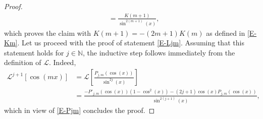 \documentclass[12pt,psamsfonts]{amsart}
\begin{document}
\begin{proof}
\begin{align*}
                                          &= \frac{K(m+1)}{\sin^{2(m+1)}(x)} ,
\end{align*}
which proves the claim with  $K(m+1)=-(2m+1)K(m)$ as defined in \eqref{E-Km}. Let us proceed with the
proof of statement \eqref{E-Ljm}. Assuming that this statement holds for $j\in {\mathbb{N}}$, the inductive step
follows immediately from the definition of ${\mathscr{L}}$. Indeed,
\begin{align*}
    {\mathscr{L}}^{j+1}[\cos(mx)]&= {\mathscr{L}}\left[ \frac{P_{j,m}(\cos(x))}{\sin^{2j}(x)}\right] \\
                       &= \frac{-P'_{j,m}(\cos(x))(1-\cos^2(x))-(2j+1)\cos(x)P_{j,m}
                       (\cos(x))}{\sin^{2(j+1)}(x)},
\end{align*}
which in view of \eqref{E-Pjm} concludes the proof.
\end{proof}
\end{document}
